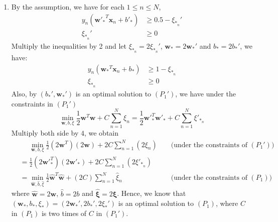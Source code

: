 \documentclass{article}
\begin{document}
\begin{CJK*}{UTF8}{bsmi}
\begin{normalsize}
\begin{enumerate}[label=\textbf{\arabic*}.]
        \item By the assumption, we have for each $1 \le n \le N$,
        \[\begin{aligned}
            y_n({\mathbf{w}'_*}^T\mathbf{x}_n + b'_*) &\ge 0.5 - \xi_{*_n}'\\
            \xi_{*_n}' &\ge 0\end{aligned}\]
        Multiply the inequalities by 2 and let $\xi_{*_n} = 2\xi_{*_n}'$, $\mathbf{w}_* = 2\mathbf{w}_*'$ and $b_* = 2b_*'$, we have:
        \[ \begin{aligned} y_n({\mathbf{w}_*}^T\mathbf{x}_n + b_*) &\ge 1 - \xi_{*_n}\\
        \xi_{*_n} &\ge 0\end{aligned} \]
        Also, by $(b_*', \mathbf{w}_*')$ is an optimal solution to $(P_1')$, we have under the constraints in $(P_1')$
        \[ \min_{\mathbf{w}, b, \xi}\frac{1}{2}\mathbf{w}^T\mathbf{w} + C\sum_{n=1}^N \xi_n = \frac{1}{2}\mathbf{w'}_*^T\mathbf{w'}_* + C\sum_{n=1}^N \xi'_{*_n} \]
        Multiply both side by $4$, we obtain
        \[ \begin{aligned} &\phantom{=} \min_{\mathbf{w}, b, \xi}\frac{1}{2}(2\mathbf{w}^T)(2\mathbf{w}) + 2C\sum_{n=1}^N (2\xi_n) &&\text{ (under the constraints of $(P_1')$) }\\ &= \frac{1}{2}(2\mathbf{w'}_*^T)(2\mathbf{w'}_*) + 2C\sum_{n=1}^N (2\xi'_{*_n})\\
        &= \min_{\hat{\mathbf{w}}, \hat{b}, \hat{\xi}} \frac{1}{2} \hat{\mathbf{w}}^T \hat{\mathbf{w}} + (2C)\sum_{n=1}^N \hat{\xi}_n \enspace &&\text{ (under the constraints of $(P_1)$) } \end{aligned} \]
        where $\hat{\mathbf{w}} = 2\mathbf{w}$, $\hat{b} = 2b$ and $\hat{\mathbf{\xi}} = {2\mathbf{\xi}}$.
        Hence, we know that $(\mathbf{w}_*, b_*, \xi_*) = (2\mathbf{w}_*', 2b_*', 2\xi_*')$ is an optimal solution to $(P_1)$, where $C$ in $(P_1)$ is two times of $C$ in $(P_1')$.
        

\end{enumerate}
\end{normalsize}
\end{CJK*}
\end{document}
